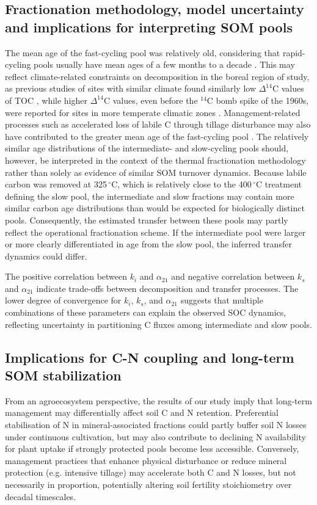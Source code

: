 \documentclass[bg, manuscript]{copernicus}
\begin{document}
\subsection{Fractionation methodology, model uncertainty and implications for interpreting SOM pools}
The mean age of the fast-cycling pool was relatively old, considering that rapid-cycling pools usually have mean ages of a few months to a decade \citep{Trumbore2009}. This may reflect climate-related constraints on decomposition in the boreal region of study, as previous studies of sites with similar climate found similarly low $\Delta^{14}\text{C}$ values of TOC \citep{Spohn2023, Ellert2006}, while higher $\Delta^{14}\text{C}$ values, even before the $^{14}\text{C}$ bomb spike of the 1960s, were reported for sites in more temperate climatic zones \citep{Stoner2021, Baisden2013, Mills2014}. Management-related processes such as accelerated loss of labile C through tillage disturbance may also have contributed to the greater mean age of the fast-cycling pool \citep{Grandy2007}. The relatively similar age distributions of the intermediate- and slow-cycling pools should, however, be interpreted in the context of the thermal fractionation methodology rather than solely as evidence of similar SOM turnover dynamics. Because labile carbon was removed at 325\,$^\circ\text{C}$, which is relatively close to the 400\,$^\circ\text{C}$ treatment defining the slow pool, the intermediate and slow fractions may contain more similar carbon age distributions than would be expected for biologically distinct pools. Consequently, the estimated transfer between these pools may partly reflect the operational fractionation scheme. If the intermediate pool were larger or more clearly differentiated in age from the slow pool, the inferred transfer dynamics could differ.

The positive correlation between $k_i$ and $\alpha_{21}$ and negative correlation between $k_s$ and $\alpha_{21}$ indicate trade-offs between decomposition and transfer processes. The lower degree of convergence for $k_i$, $k_s$, and $\alpha_{21}$ suggests that multiple combinations of these parameters can explain the observed SOC dynamics, reflecting uncertainty in partitioning C fluxes among intermediate and slow pools.

\subsection{Implications for C-N coupling and long-term SOM stabilization}
From an agroecosystem perspective, the results of our study imply that long-term management may differentially affect soil C and N retention. Preferential stabilisation of N in mineral-associated fractions could partly buffer soil N losses under continuous cultivation, but may also contribute to declining N availability for plant uptake if strongly protected pools become less accessible. Conversely, management practices that enhance physical disturbance or reduce mineral protection (e.g. intensive tillage) may accelerate both C and N losses, but not necessarily in proportion, potentially altering soil fertility stoichiometry over decadal timescales.
\end{document}

